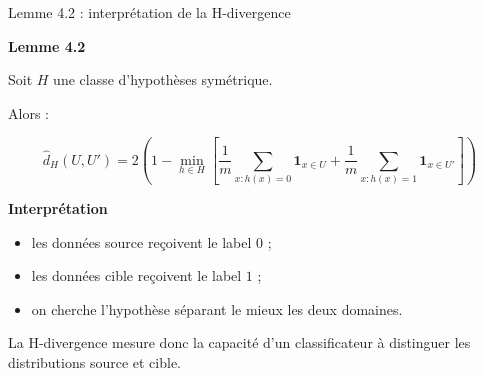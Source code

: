 \documentclass[11pt]{beamer}
\begin{document}
\begin{frame}{Lemme 4.2 : interprétation de la H-divergence}

\textbf{Lemme 4.2}

\vspace{0.3cm}

Soit $H$ une classe d’hypothèses symétrique.

Alors :

\[
\hat d_H(U,U')
=
2
\left(
1-
\min_{h \in H}
\left[
\frac{1}{m}
\sum_{x:h(x)=0}\mathbf{1}_{x\in U}
+
\frac{1}{m}
\sum_{x:h(x)=1}\mathbf{1}_{x\in U'}
\right]
\right)
\]

\vspace{0.3cm}

\textbf{Interprétation}

\vspace{0.2cm}

\begin{itemize}
    \item les données source reçoivent le label $0$ ;
    
    \item les données cible reçoivent le label $1$ ;
    
    \item on cherche l’hypothèse séparant le mieux les deux domaines.
\end{itemize}

\vspace{0.3cm}

La H-divergence mesure donc la capacité
d’un classificateur à distinguer
les distributions source et cible.

\end{frame}
\end{document}
